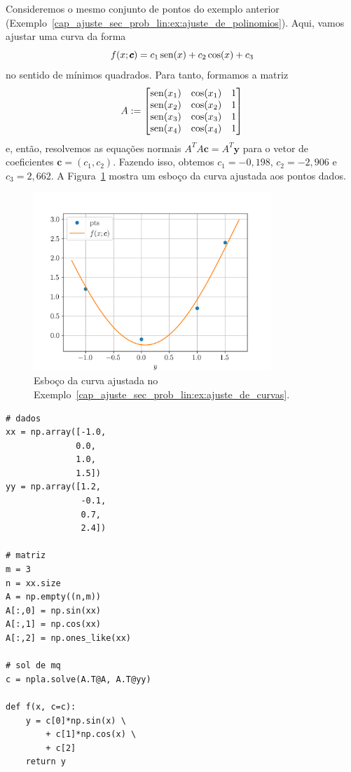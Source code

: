 \begin{ex}\label{cap_ajuste_sec_prob_lin:ex:ajuste_de_curvas}
  Consideremos o mesmo conjunto de pontos do exemplo anterior (Exemplo~\ref{cap_ajuste_sec_prob_lin:ex:ajuste_de_polinomios}). Aqui, vamos ajustar uma curva da forma
  \begin{equation}
    f(x; \pmb{c}) = c_1\operatorname{sen}(x) + c_2\cos(x) + c_3
  \end{equation}
no sentido de mínimos quadrados. Para tanto, formamos a matriz
\begin{equation}
  A :=
  \begin{bmatrix}
    \operatorname{sen}(x_1) & \cos(x_1) & 1 \\
    \operatorname{sen}(x_2) & \cos(x_2) & 1 \\
    \operatorname{sen}(x_3) & \cos(x_3) & 1 \\
    \operatorname{sen}(x_4) & \cos(x_4) & 1
  \end{bmatrix}
\end{equation}
  e, então, resolvemos as equações normais $A^TA\pmb{c} = A^T\pmb{y}$ para o vetor de coeficientes $\pmb{c} = (c_1, c_2)$. Fazendo isso, obtemos $c_1=-0,198$, $c_2=-2,906$ e $c_3=2,662$. A Figura~\ref{cap_ajuste_sec_prob_lin:fig:ex_ajuste_de_curvas} mostra um esboço da curva ajustada aos pontos dados.

  \begin{figure}[h]
    \centering
    \includegraphics[width=0.8\textwidth]{cap_ajuste/dados/fig_mqCurva/fig}
    \caption{Esboço da curva ajustada no Exemplo~\ref{cap_ajuste_sec_prob_lin:ex:ajuste_de_curvas}.}
    \label{cap_ajuste_sec_prob_lin:fig:ex_ajuste_de_curvas}
  \end{figure}

\begin{lstlisting}[caption=mqCurva.py]
# dados
xx = np.array([-1.0,
              0.0,
              1.0,
              1.5])
yy = np.array([1.2,
               -0.1,
               0.7,
               2.4])

# matriz
m = 3
n = xx.size
A = np.empty((n,m))
A[:,0] = np.sin(xx)
A[:,1] = np.cos(xx)
A[:,2] = np.ones_like(xx)

# sol de mq
c = npla.solve(A.T@A, A.T@yy)

def f(x, c=c):
    y = c[0]*np.sin(x) \
        + c[1]*np.cos(x) \
        + c[2]
    return y
\end{lstlisting}
\end{ex}

